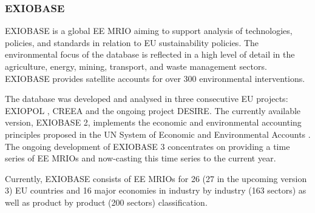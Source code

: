 \subsubsection{EXIOBASE}


EXIOBASE is a global EE MRIO aiming to support analysis of technologies,
policies, and standards in relation to EU sustainability policies. The
environmental focus of the database is reflected in a high level of detail in the
agriculture, energy, mining, transport, and waste management sectors. EXIOBASE provides satellite accounts for over 300 environmental
interventions.  

The database was developed and analysed in three consecutive EU projects: EXIOPOL \cite{Tukker_2013}, CREEA \cite{Wood_2014} and the ongoing project DESIRE. The currently available version, EXIOBASE 2, implements the
economic and environmental accounting principles proposed in the UN System of
Economic and Environmental Accounts \cite{european_commission._system_2014}.
The ongoing development of EXIOBASE 3 concentrates on providing a time series
of EE MRIOs and now-casting this time series to the current year. 

Currently, EXIOBASE consists of EE MRIOs for 26 (27 in the upcoming version 3) EU countries
and 16 major economies in industry by industry (163 sectors) as well as
product by product (200 sectors) classification.